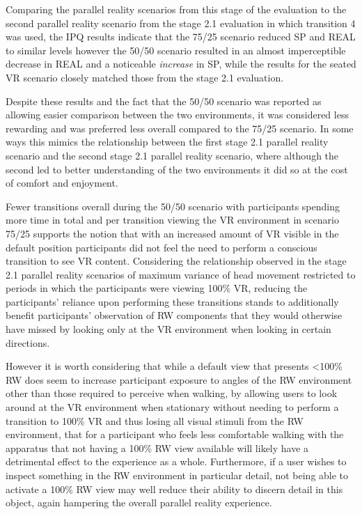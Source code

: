 Comparing the parallel reality scenarios from this stage of the evaluation to the second parallel reality scenario from the stage 2.1 evaluation in which transition 4 was used, the IPQ results indicate that the 75/25 scenario reduced SP and REAL to similar levels however the 50/50 scenario resulted in an almost imperceptible decrease in REAL and a noticeable \textit{increase} in SP, while the results for the seated VR scenario closely matched those from the stage 2.1 evaluation.

Despite these results and the fact that the 50/50 scenario was reported as allowing easier comparison between the two environments, it was considered less rewarding and was preferred less overall compared to the 75/25 scenario. In some ways this mimics the relationship between the first stage 2.1 parallel reality scenario and the second stage 2.1 parallel reality scenario, where although the second led to better understanding of the two environments it did so at the cost of comfort and enjoyment.

Fewer transitions overall during the 50/50 scenario with participants spending more time in total and per transition viewing the VR environment in scenario 75/25 supports the notion that with an increased amount of VR visible in the default position participants did not feel the need to perform a conscious transition to see VR content. Considering the relationship observed in the stage 2.1 parallel reality scenarios of maximum variance of head movement restricted to periods in which the participants were viewing 100\% VR, reducing the participants' reliance upon performing these transitions stands to additionally benefit participants' observation of RW components that they would otherwise have missed by looking only at the VR environment when looking in certain directions.

However it is worth considering that while a default view that presents \textless 100\% RW does seem to increase participant exposure to angles of the RW environment other than those required to perceive when walking, by allowing users to look around at the VR environment when stationary without needing to perform a transition to 100\% VR and thus losing all visual stimuli from the RW environment, that for a participant who feels less comfortable walking with the apparatus that not having a 100\% RW view available will likely have a detrimental effect to the experience as a whole. Furthermore, if a user wishes to inspect something in the RW environment in particular detail, not being able to activate a 100\% RW view may well reduce their ability to discern detail in this object, again hampering the overall parallel reality experience.


